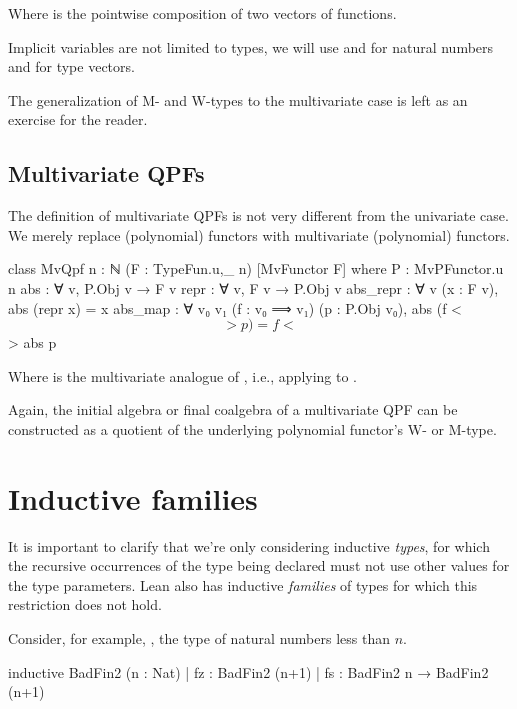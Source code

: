 Where  is the pointwise composition of two vectors of functions.

\begin{remark}
    Implicit variables are not limited to types, we will use  and  for natural numbers and  for type vectors.
\end{remark}

The generalization of M- and W-types to the multivariate case is left as an exercise for the reader.

\subsection*{Multivariate QPFs}
The definition of multivariate QPFs is not very different from the univariate case. We merely replace (polynomial) functors with multivariate (polynomial) functors.

\begin{leancode}
  class MvQpf {n : ℕ} (F : TypeFun.{u,_} n) [MvFunctor F]  where
    P         : MvPFunctor.{u} n
    abs       : ∀ {v}, P.Obj v → F v
    repr      : ∀ {v}, F v → P.Obj v
    abs_repr  : ∀ {v} (x : F v), abs (repr x) = x
    abs_map   : ∀ {v₀ v₁} (f : v₀ ⟹ v₁) (p : P.Obj v₀), 
                    abs (f <$$> p) = f <$$> abs p
\end{leancode}

Where  is the multivariate analogue of , i.e., applying 
 to .

Again, the initial algebra or final coalgebra of a multivariate QPF
can be constructed as a quotient of the underlying polynomial functor's W- or M-type.


\section{Inductive families}%
\label{sec:ind_families}

It is important to clarify that we're only considering inductive \emph{types}, 
for which the recursive occurrences of the type being declared must not use other values for the type parameters. Lean also has inductive \emph{families} of types for which this restriction does not hold.

Consider, for example, , the type of natural numbers less than $n$.
\begin{badleancode}
    inductive BadFin2 (n : Nat)
    | fz : BadFin2 (n+1)
    | fs : BadFin2 n → BadFin2 (n+1)
\end{badleancode}

